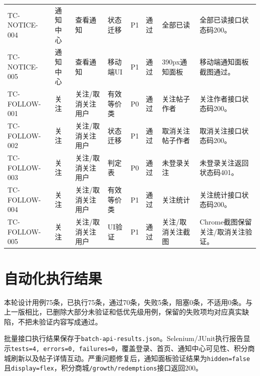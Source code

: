 \documentclass[UTF8,zihao=-4]{ctexart}
\begin{document}
{\begin{longtable}{P{1.7cm}P{1.8cm}P{2.3cm}P{1.8cm}P{0.9cm}P{1.2cm}P{3.7cm}P{5.8cm}}
TC-NOTICE-004 & 通知中心 & 查看通知 & 状态迁移 & P1 & 通过 & 全部已读 & 全部已读接口状态码200。 \\
TC-NOTICE-005 & 通知中心 & 查看通知 & 移动端UI & P1 & 通过 & 390px通知面板 & 移动端通知面板截图通过。 \\
TC-FOLLOW-001 & 关注 & 关注/取消关注用户 & 有效等价类 & P0 & 通过 & 关注帖子作者 & 关注作者接口状态码200。 \\
TC-FOLLOW-002 & 关注 & 关注/取消关注用户 & 状态迁移 & P1 & 通过 & 取消关注帖子作者 & 取消关注接口状态码200。 \\
TC-FOLLOW-003 & 关注 & 关注/取消关注用户 & 判定表 & P0 & 通过 & 未登录关注 & 未登录关注返回状态码401。 \\
TC-FOLLOW-004 & 关注 & 关注/取消关注用户 & 有效等价类 & P1 & 通过 & 关注统计 & 关注统计接口状态码200。 \\
TC-FOLLOW-005 & 关注 & 关注/取消关注用户 & UI验证 & P1 & 通过 & 关注/取消关注截图 & Chrome截图保留关注/取消关注验证。 \\
\bottomrule
\end{longtable}
}

\section{自动化执行结果}
本轮设计用例75条，已执行75条，通过70条，失败5条，阻塞0条，不适用0条。与上一版相比，已删除大部分未验证和低优先级用例，保留的失败项均对应真实缺陷，不把未验证内容写成通过。

批量接口执行结果保存于\texttt{batch-api-results.json}。Selenium/JUnit执行报告显示\texttt{tests=4, errors=0, failures=0}，覆盖登录、首页、通知中心可见性、积分商城刷新以及帖子详情互动。严重问题修复后，通知面板验证结果为\texttt{hidden=false}且\texttt{display=flex}，积分商城\texttt{/growth/redemptions}接口返回200。
\end{document}
